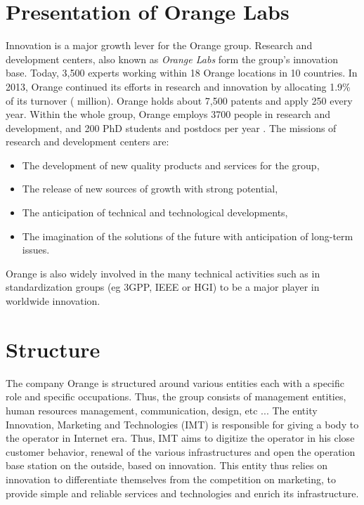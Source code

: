 
\section{Presentation of Orange Labs}
Innovation is a major growth lever for the Orange group. Research and development centers, also known as \textit{Orange Labs} form the group's innovation base. Today, 3,500 experts working within 18 Orange locations in 10 countries. In 2013, Orange continued its efforts in research and innovation by allocating 1.9\% of its turnover ( million). Orange holds about 7,500 patents and apply 250 every year. Within the whole group, Orange employs 3700 people in research and development, and 200 PhD students and postdocs per year . The missions of research and development centers are:

\begin{itemize}
	\item The development of new quality products and services for the group,
	\item The release of new sources of growth with strong potential,
	\item The anticipation of technical and technological developments,
 	\item	The imagination of the solutions of the future with anticipation of long-term issues.
\end{itemize}

Orange is also widely involved in the many technical activities such as in standardization groups (eg 3GPP, IEEE or HGI) to be a major player in worldwide innovation.

\section{Structure}
The company Orange is structured around various entities each with a specific role and specific occupations. Thus, the group consists of management entities, human resources management, communication, design, etc ... The entity Innovation, Marketing and Technologies (IMT) is responsible for giving a body to the operator in Internet era. Thus, IMT aims to digitize the operator in his close customer behavior, renewal of the various infrastructures and open the operation base station on the outside, based on innovation. This entity thus relies on innovation to differentiate themselves from the competition on marketing, to provide simple and reliable services and technologies and enrich its infrastructure.

